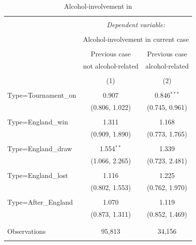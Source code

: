 \documentclass[12pt, a4paper]{article}
\begin{document}
\begin{table}
\centering
 \caption{Alcohol-involvement in }
  \label{days}
  \begin{threeparttable}
\begin{tabular}{@{\extracolsep{5pt}}lcc} 
\\[-1.8ex]\hline 
\hline \\[-1.8ex] 
 & \multicolumn{2}{c}{\textit{Dependent variable:}} \\ 
\cline{2-3} 
\\[-1.8ex] & \multicolumn{2}{c}{Alcohol-involvement in current case} \\ 
\\[-1.8ex] & Previous case & Previous case\\
& not alcohol-related & alcohol-related\\ 
\\[-1.8ex] & (1) & (2)\\ 
\hline \\[-1.8ex] 
 Type=Tournament\_on & 0.907 & 0.846$^{***}$ \\ 
  & (0.806, 1.022) & (0.745, 0.961) \\ 
  & & \\ 
 Type=England\_win & 1.311 & 1.168 \\ 
  & (0.909, 1.890) & (0.773, 1.765) \\ 
  & & \\ 
 Type=England\_draw & 1.554$^{**}$ & 1.339 \\ 
  & (1.066, 2.265) & (0.723, 2.481) \\ 
  & & \\ 
 Type=England\_lost & 1.116 & 1.225 \\ 
  & (0.802, 1.553) & (0.762, 1.970) \\ 
  & & \\ 
 Type=After\_England & 1.070 & 1.119 \\ 
  & (0.873, 1.311) & (0.852, 1.469) \\ 
  & & \\ 
\hline \\[-1.8ex] 
Observations & 95,813 & 34,156 \\ 
\hline 
\hline \\[-1.8ex] 
\end{tabular} 

\end{threeparttable}
\end{table}
\end{document}
